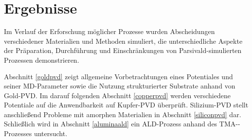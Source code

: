 \cleardoublepage
\chapter{Ergebnisse}

Im Verlauf der Erforschung möglicher Prozesse wurden Abscheidungen verschiedener Materialien und Methoden simuliert, die unterschiedliche Aspekte der Präparation, Durchführung und Einschränkungen von Parsivald-simulierten Prozessen demonstrieren.

Abschnitt \ref{goldpvd} zeigt allgemeine Vorbetrachtungen eines Potentiales und seiner MD-Parameter sowie die Nutzung strukturierter Substrate anhand von Gold-PVD.
Im darauf folgenden Abschnitt \ref{copperpvd} werden verschiedene Potentiale auf die Anwendbarkeit auf Kupfer-PVD überprüft.
Silizium-PVD stellt anschließend Probleme mit amorphen Materialien in Abschnitt \ref{siliconpvd} dar.
Schließlich wird in Abschnitt \ref{aluminaald} ein ALD-Prozess anhand des TMA--Prozesses untersucht.


\clearpage

\clearpage

\clearpage

